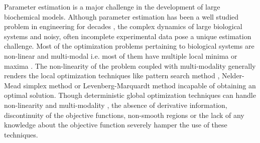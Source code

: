 \documentclass[12pt]{article}
\begin{document}
Parameter estimation is a major challenge in the development of large biochemical models.
Although parameter estimation has been a well studied problem in engineering for decades \cite{nieman1971review,beck1977parameter,young1981parameter,beck1998inverse},
the complex dynamics of large biological systems and noisy, often incomplete experimental data pose a unique estimation challenge.
Most of the optimization problems pertaining to biological systems are non-linear and multi-modal i.e. most of them have multiple local minima or maxima \cite{moles2003parameter,banga2008optimization}. The non-linearity of the problem coupled with multi-modality generally renders the local optimization techniques like pattern search method \cite{hooke1961direct}, Nelder-Mead simplex method \cite{nelder1965simplex} or Levenberg-Marquardt method\cite{more1978levenberg} incapable of obtaining an optimal solution. Though deterministic global optimization techniques can handle non-linearity and multi-modality \cite{esposito2000deterministic,horst2013global}, the absence of derivative information, discontinuity of the objective functions, non-smooth regions or the lack of any knowledge about the objective function severely hamper the use of these techniques.
\end{document}
